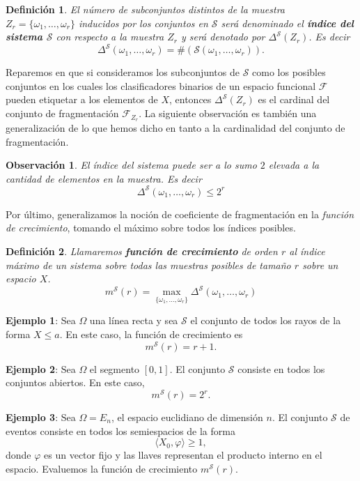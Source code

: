 \documentclass{report}
\newtheorem{dfn}{Definición}[section]
\newtheorem{obs}{Observación}[section]
\begin{document}
\begin{dfn}
El número de subconjuntos distintos de la muestra \( Z_r = \{\omega_1, \dots, \omega_r\} \)
inducidos por los conjuntos en \( \mathcal{S} \) será denominado el \textbf{índice
del sistema \( \mathcal{S} \)} con respecto a la muestra \( Z_r \)
y será denotado por $\Delta^{\mathcal{S}}(Z_r)$. Es decir
\[
\Delta^{\mathcal{S}}(\omega_1, \dots, \omega_r) = \#\left(\mathcal{S}(\omega_1, \dots, \omega_r)\right).
\]
\end{dfn}

Reparemos en que si consideramos los subconjuntos de $\mathcal{S}$ como los posibles conjuntos en
los cuales los clasificadores binarios de un espacio funcional $\mathcal{F}$ pueden etiquetar a los
elementos de $X$, entonces $\Delta^{\mathcal{S}}(Z_r)$ es el cardinal del conjunto de fragmentación $\mathcal{F}_{Z_r}$.
La siguiente observación es también una generalización
de lo que hemos dicho en tanto a la cardinalidad del conjunto de fragmentación.


\begin{obs} El índice del sistema puede ser a lo sumo $2$ elevada a la cantidad de elementos en la muestra. Es decir
\[
    \Delta^{\mathcal{S}}(\omega_1, \dots, \omega_r) \leq 2^r
\]
\end{obs}

Por último, generalizamos la noción de coeficiente de fragmentación en la \textit{función de crecimiento},
tomando el máximo sobre todos los índices posibles.

\begin{dfn}
    Llamaremos \textbf{función de crecimiento} de orden $r$ al índice máximo de un sistema sobre todas las muestras
    posibles de tamaño $r$ sobre un espacio $X$.
    \[
    m^{\mathcal{S}}(r) = \max_{\{\omega_1,\dots,\omega_r\}}\Delta^{\mathcal{S}}(\omega_1,\dots,\omega_r)
    \]
\end{dfn}
\bigskip

\textbf{Ejemplo 1}: Sea \( \Omega \) una línea recta y sea \( \mathcal{S} \) el conjunto
de todos los rayos de la forma \( X \leq a \). En este caso, la función de crecimiento es
\[
m^{\mathcal{S}}(r) = r + 1.
\]

\textbf{Ejemplo 2}: Sea \( \Omega \) el segmento \([0,1]\). El conjunto \( \mathcal{S} \)
consiste en todos los conjuntos abiertos. En este caso,
\[
m^{\mathcal{S}}(r) = 2^r.
\]

\textbf{Ejemplo 3}: Sea \( \Omega = E_n \), el espacio euclidiano de dimensión \( n \).
El conjunto \( \mathcal{S} \) de eventos consiste en todos los semiespacios de la forma
\[
\langle X_0, \varphi \rangle \geq 1,
\]
donde \( \varphi \) es un vector fijo y las llaves representan el producto interno en el espacio.
 Evaluemos la función de crecimiento \( m^{\mathcal{S}}(r) \).
\end{document}
